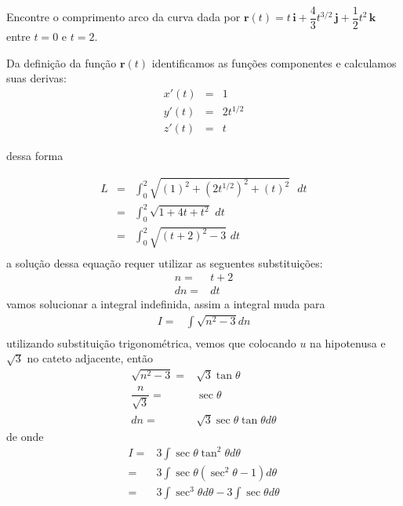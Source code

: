 \documentclass[a4papper,12pt]{article}
\begin{document}
Encontre o comprimento arco da curva dada por $\mathbf{r}(t) = t \,\mathbf{i} + \dfrac{4}{3}t^{3/2}\,\mathbf{j} + \dfrac{1}{2}t^{2}  \,\mathbf{k}$ entre $t=0$ e $t=2$.


Da definição da função $\mathbf{r}(t)$ identificamos as funções componentes e calculamos suas derivas:
          \begin{eqnarray*}
            x'(t) &=& 1\\
            y'(t) &=& 2t^{1/2}\\
            z'(t) &=& t
          \end{eqnarray*}
        
        dessa forma
        
          \begin{eqnarray*}
            L &=& \int_0^2 \sqrt{\left( 1 \right)^2 + \left( 2t^{1/2} \right)^2 + \left( t\right)^2}\,\,\,\,dt\\
            &=& \int_0^2 \sqrt{1 + 4t + t^2}\,\,dt\\
            &=& \int_0^2 \sqrt{(t+2)^2 -3}\,\,dt\\
          \end{eqnarray*}
a solução dessa equação requer utilizar as seguentes substituições:
          \begin{eqnarray*}
            n  =& t+2\\
            dn =& dt 
          \end{eqnarray*}
        vamos solucionar a integral indefinida, assim a integral muda para
          \begin{eqnarray*}
            I =& \int \sqrt{n^2 - 3} dn\\
          \end{eqnarray*}
        utilizando substituição trigonométrica, vemos que colocando $u$ na hipotenusa e $\sqrt{3}$ no cateto adjacente, então
          \begin{eqnarray*}
          \sqrt{n^2 - 3} =& \sqrt{3}\tan \theta\\
          \dfrac{n}{\sqrt{3}} =&\sec \theta\\
          dn =& \sqrt{3} \sec \theta \tan \theta d\theta
          \end{eqnarray*}
        de onde
        \[
          \begin{array}{rl}
          I =& 3\int \sec \theta \tan ^2 \theta d\theta \nonumber\\
            =&  3\int \sec \theta \left( \sec ^2 \theta - 1\right)d\theta \nonumber\\
            =&  3\int \sec ^3 \theta d\theta - 3\int \sec \theta d\theta \nonumber
          \end{array}
        \]
\end{document}
